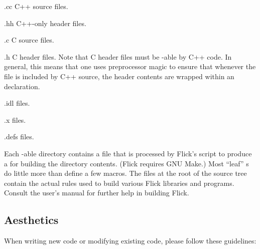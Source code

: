 \begin{filenamelist}
  \item[.cc] C++ source files.

  \item[.hh] C++-only header files.

  \item[.c] C source files.

  \item[.h] C header files.  Note that C header files must be
  -able by C++ code.  In general, this means that one
  uses preprocessor magic to ensure that whenever the file is included by C++
  source, the header contents are wrapped within an 
  declaration.

  \item[.idl] \CORBA{} \IDL{} files.

  \item[.x] \ONCRPC{} \IDL{} files.

  \item[.defs] \MIG{} \IDL{} files.
\end{filenamelist}

Each -able directory contains a  file
that is processed by Flick's  script to produce a
 for building the directory contents.  (Flick requires
GNU Make.)  Most ``leaf'' s do little more than define a
few macros.  The  files at the root of the source tree
contain the actual rules used to build various Flick libraries and programs.
Consult the user's manual for further help in building Flick.



\subsection{Aesthetics}
\label{subsec:Coding:Aesthetics}

When writing new code or modifying existing code, please follow these
guidelines:

